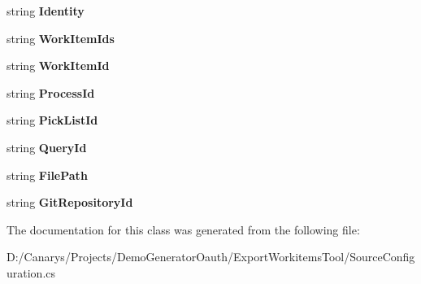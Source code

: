 \begin{DoxyCompactItemize}
string {\bfseries Identity}
\item 
\mbox{\label{class_templates_generator_tool_1_1_source_configuration_ab5b6f1dd79f3808dceacdeb93bc1d582}} 
string {\bfseries Work\+Item\+Ids}
\item 
\mbox{\label{class_templates_generator_tool_1_1_source_configuration_acc9fb5a0b38f2ff4d3b6bec38bf130d1}} 
string {\bfseries Work\+Item\+Id}
\item 
\mbox{\label{class_templates_generator_tool_1_1_source_configuration_a6685e57cb95f0a7d42e8bb3368317c16}} 
string {\bfseries Process\+Id}
\item 
\mbox{\label{class_templates_generator_tool_1_1_source_configuration_aef64a91dca43071513eb4ba93ccabf1c}} 
string {\bfseries Pick\+List\+Id}
\item 
\mbox{\label{class_templates_generator_tool_1_1_source_configuration_ae0734ae9185120257ddd7a01806493fd}} 
string {\bfseries Query\+Id}
\item 
\mbox{\label{class_templates_generator_tool_1_1_source_configuration_a70a791cb80d804ae75c2c28b5e4dab4a}} 
string {\bfseries File\+Path}
\item 
\mbox{\label{class_templates_generator_tool_1_1_source_configuration_ae79fa2db7e8b6570a37278898ffc2639}} 
string {\bfseries Git\+Repository\+Id}
\end{DoxyCompactItemize}


The documentation for this class was generated from the following file\+:\begin{DoxyCompactItemize}
\item 
D\+:/\+Canarys/\+Projects/\+Demo\+Generator\+Oauth/\+Export\+Workitems\+Tool/Source\+Configuration.\+cs\end{DoxyCompactItemize}
